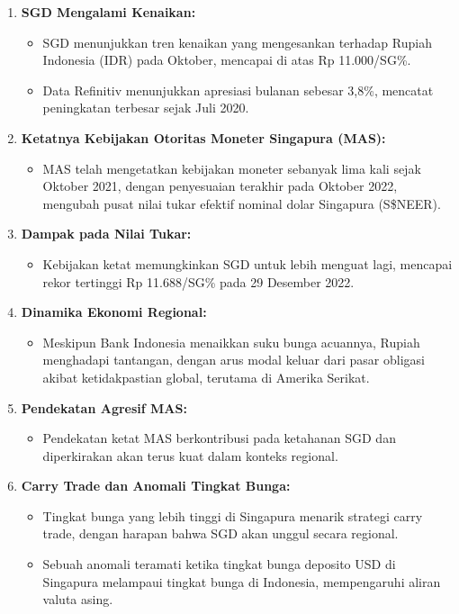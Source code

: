 \documentclass[12pt]{article}
\begin{document}
\begin{enumerate}
    \item \textbf{SGD Mengalami Kenaikan:}
    \begin{itemize}
        \item SGD menunjukkan tren kenaikan yang mengesankan terhadap Rupiah Indonesia (IDR) pada Oktober, mencapai di atas Rp 11.000/SG\%.
        \item Data Refinitiv menunjukkan apresiasi bulanan sebesar 3,8\%, mencatat peningkatan terbesar sejak Juli 2020.
    \end{itemize}

    \item \textbf{Ketatnya Kebijakan Otoritas Moneter Singapura (MAS):}
    \begin{itemize}
        \item MAS telah mengetatkan kebijakan moneter sebanyak lima kali sejak Oktober 2021, dengan penyesuaian terakhir pada Oktober 2022, mengubah pusat nilai tukar efektif nominal dolar Singapura (S\$NEER).
    \end{itemize}

    \item \textbf{Dampak pada Nilai Tukar:}
    \begin{itemize}
        \item Kebijakan ketat memungkinkan SGD untuk lebih menguat lagi, mencapai rekor tertinggi Rp 11.688/SG\% pada 29 Desember 2022.
    \end{itemize}

    \item \textbf{Dinamika Ekonomi Regional:}
    \begin{itemize}
        \item Meskipun Bank Indonesia menaikkan suku bunga acuannya, Rupiah menghadapi tantangan, dengan arus modal keluar dari pasar obligasi akibat ketidakpastian global, terutama di Amerika Serikat.
    \end{itemize}

    \item \textbf{Pendekatan Agresif MAS:}
    \begin{itemize}
        \item Pendekatan ketat MAS berkontribusi pada ketahanan SGD dan diperkirakan akan terus kuat dalam konteks regional.
    \end{itemize}

    \item \textbf{Carry Trade dan Anomali Tingkat Bunga:}
    \begin{itemize}
        \item Tingkat bunga yang lebih tinggi di Singapura menarik strategi carry trade, dengan harapan bahwa SGD akan unggul secara regional.
        \item Sebuah anomali teramati ketika tingkat bunga deposito USD di Singapura melampaui tingkat bunga di Indonesia, mempengaruhi aliran valuta asing.
    \end{itemize}


\end{enumerate}
\end{document}
